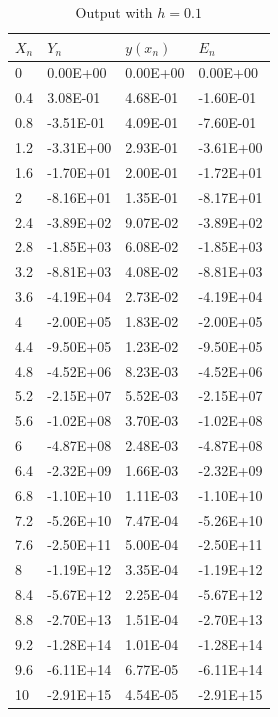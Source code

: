 \documentclass[10pt,a4paper]{report}
\begin{document}
\hspace{0.5cm}
\begin{minipage}[b]{0.45\linewidth}



\begin{table}[H]
\centering
\begin{tabular}{|l|l|l|l|}
\hline
$X_n$ & $Y_n$      & $y(x_n)$  & $E_n$      \\ \hline
0    & 0.00E+00  & 0.00E+00 & 0.00E+00  \\ \hline
0.4  & 3.08E-01  & 4.68E-01 & -1.60E-01 \\ \hline
0.8  & -3.51E-01 & 4.09E-01 & -7.60E-01 \\ \hline
1.2  & -3.31E+00 & 2.93E-01 & -3.61E+00 \\ \hline
1.6  & -1.70E+01 & 2.00E-01 & -1.72E+01 \\ \hline
2    & -8.16E+01 & 1.35E-01 & -8.17E+01 \\ \hline
2.4  & -3.89E+02 & 9.07E-02 & -3.89E+02 \\ \hline
2.8  & -1.85E+03 & 6.08E-02 & -1.85E+03 \\ \hline
3.2  & -8.81E+03 & 4.08E-02 & -8.81E+03 \\ \hline
3.6  & -4.19E+04 & 2.73E-02 & -4.19E+04 \\ \hline
4    & -2.00E+05 & 1.83E-02 & -2.00E+05 \\ \hline
4.4  & -9.50E+05 & 1.23E-02 & -9.50E+05 \\ \hline
4.8  & -4.52E+06 & 8.23E-03 & -4.52E+06 \\ \hline
5.2  & -2.15E+07 & 5.52E-03 & -2.15E+07 \\ \hline
5.6  & -1.02E+08 & 3.70E-03 & -1.02E+08 \\ \hline
6    & -4.87E+08 & 2.48E-03 & -4.87E+08 \\ \hline
6.4  & -2.32E+09 & 1.66E-03 & -2.32E+09 \\ \hline
6.8  & -1.10E+10 & 1.11E-03 & -1.10E+10 \\ \hline
7.2  & -5.26E+10 & 7.47E-04 & -5.26E+10 \\ \hline
7.6  & -2.50E+11 & 5.00E-04 & -2.50E+11 \\ \hline
8    & -1.19E+12 & 3.35E-04 & -1.19E+12 \\ \hline
8.4  & -5.67E+12 & 2.25E-04 & -5.67E+12 \\ \hline
8.8  & -2.70E+13 & 1.51E-04 & -2.70E+13 \\ \hline
9.2  & -1.28E+14 & 1.01E-04 & -1.28E+14 \\ \hline
9.6  & -6.11E+14 & 6.77E-05 & -6.11E+14 \\ \hline
10   & -2.91E+15 & 4.54E-05 & -2.91E+15 \\ \hline
\end{tabular}
\caption{Output with $h=0.1$}
\end{table}

\end{minipage}
\end{document}
